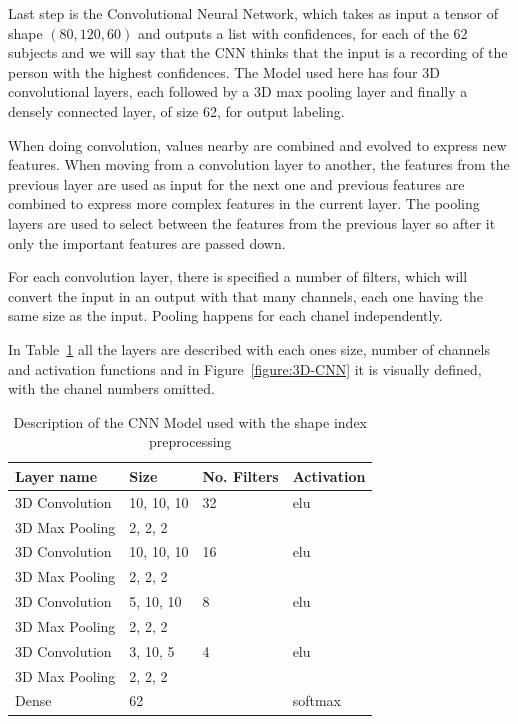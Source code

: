 \documentclass[12pt]{article}
\theoremstyle{definition}
\begin{document}
	Last step is the Convolutional Neural Network, which takes as input a tensor of shape $(80, 120, 60)$ and outputs a list with confidences, for each of the 62 subjects and we will say that the CNN thinks that the input is a recording of the person with the highest confidences.
	The Model used here has four 3D convolutional layers, each followed by a 3D max pooling layer and finally a densely connected layer, of size 62, for output labeling.

	When doing convolution, values nearby are combined and evolved to express new features. When moving from a convolution layer to another, the features from the previous layer are used as input for the next one and previous features are combined to express more complex features in the current layer. The pooling layers are used to select between the features from the previous layer so after it only the important features are passed down.

	For each convolution layer, there is specified a number of filters, which will convert the input in an output with that many channels, each one having the same size as the input. Pooling happens for each chanel independently.

	In Table~\ref{table:preprocessing-CNN} all the layers are described with each ones size, number of channels and activation functions and in Figure~\ref{figure:3D-CNN} it is visually defined, with the chanel numbers omitted.

	\begin{table}[h]
		\centering
		\renewcommand{\arraystretch}{1.5}

		\caption{Description of the CNN Model used with the shape index preprocessing}
		\label{table:preprocessing-CNN}

		\begin{tabularx}{\textwidth}{XXXX}
			\textbf{Layer name} & \textbf{Size} & \textbf{No. Filters} & \textbf{Activation} \\ \hline
			3D Convolution & 10, 10, 10 & 32                   & elu                  \\ \hline
			3D Max Pooling & 2, 2, 2    & \textbf{\textendash} & \textbf{\textendash} \\ \hline
			3D Convolution & 10, 10, 10 & 16                   & elu                  \\ \hline
			3D Max Pooling & 2, 2, 2    & \textbf{\textendash} & \textbf{\textendash} \\ \hline
			3D Convolution & 5, 10, 10  & 8                    & elu                  \\ \hline
			3D Max Pooling & 2, 2, 2    & \textbf{\textendash} & \textbf{\textendash} \\ \hline
			3D Convolution & 3, 10, 5   & 4                    & elu                  \\ \hline
			3D Max Pooling & 2, 2, 2    & \textbf{\textendash} & \textbf{\textendash} \\ \hline
			Dense       & 62         & \textbf{\textendash} & softmax              \\
		\end{tabularx}
	\end{table}
\end{document}
